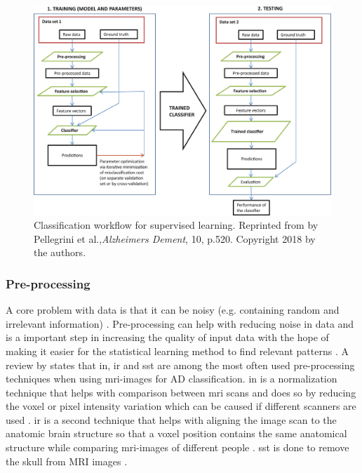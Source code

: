 \begin{figure}[H]
    \centering
        \includegraphics[scale=.9]{figures/gr1.jpg}
        \caption[Classification workflow for supervised learning]{\footnotesize Classification workflow for supervised learning. Reprinted from  by Pellegrini et al.,\textit{Alzheimers Dement}, 10, p.520. Copyright 2018 by the authors.}
    \label{fig:workflow}
\end{figure}

\subsubsection{Pre-processing} \label{prep}
A core problem with data is that it can be noisy (e.g. containing random and irrelevant information) \autocite{introdeep}. Pre-processing can help with reducing noise in data and is a important step in increasing the quality of input data \autocite{noorApplicationDeepLearning2020} with the hope of making it easier for the statistical learning method to find relevant patterns \autocite{bishop2006pattern}. A review by \textcite{ebrahimighahnaviehDeepLearningDetect2020} states that \gls{in}, \gls{ir} and \gls{sst} are among the most often used pre-processing techniques when using \gls{mri}-images for \gls{AD} classification. \gls{in} is a normalization technique that helps with comparison between \gls{mri} scans and does so by reducing the voxel or pixel intensity variation which can be caused if different scanners are used \autocite[as cited in][]{noorApplicationDeepLearning2020}. \gls{ir} is a second technique that helps with aligning the image scan to the anatomic brain structure so that a voxel position contains the same anatomical structure while comparing \gls{mri}-images of different people \autocite{ebrahimighahnaviehDeepLearningDetect2020}. \gls{sst} is done to remove the skull from MRI images \autocite{ebrahimighahnaviehDeepLearningDetect2020}.


